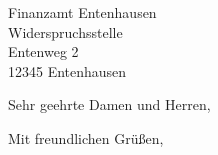 \documentclass[12pt,ngerman,parskip=half]{scrlttr2}
\begin{document}
\begin{letter}{Finanzamt Entenhausen \\ Widerspruchsstelle \\ Entenweg 2 \\ 12345 Entenhausen}

\opening{Sehr geehrte Damen und Herren,}

\blindtext

\blindtext

\blindtext

\closing{Mit freundlichen Grüßen,}
\end{letter}
\end{document}
